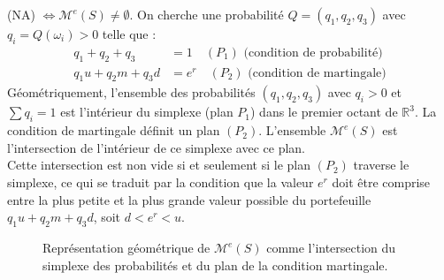 \documentclass[12pt,a4paper]{article}
\makeatletter
\numberwithin{equation}{section}
\theoremstyle{plain} %
\theoremstyle{definition} %
\theoremstyle{remark} %
\theoremstyle{myexample}
\theoremstyle{definition}
\renewenvironment{proof}[1][\proofname]{%
  \par\vspace{0.8em}%
  \pushQED{\qed}%
  \normalfont\color{cyan}%
  \topsep6\p@\@plus6\p@\relax
  \trivlist
  \item[\hskip\labelsep\bfseries\color{cyan}#1\@addpunct{.}]\ignorespaces
}{%
  \popQED\endtrivlist\vspace{0.8em}%
}
\makeatother
\begin{document}
\begin{proof}
(NA) $\iff \mathcal{M}^e(S) \neq \emptyset$. On cherche une probabilité $Q=(q_1, q_2, q_3)$ avec $q_i = Q(\omega_i) > 0$ telle que :
\begin{align*}
    q_1 + q_2 + q_3 &= 1 \quad (P_1) \text{ (condition de probabilité)} \\
    q_1 u + q_2 m + q_3 d &= e^r \quad (P_2) \text{ (condition de martingale)}
\end{align*}
Géométriquement, l'ensemble des probabilités $(q_1, q_2, q_3)$ avec $q_i>0$ et $\sum q_i=1$ est l'intérieur du simplexe (plan $P_1$) dans le premier octant de $\mathbb{R}^3$. La condition de martingale définit un plan $(P_2)$. L'ensemble $\mathcal{M}^e(S)$ est l'intersection de l'intérieur de ce simplexe avec ce plan. \\
Cette intersection est non vide si et seulement si le plan $(P_2)$ traverse le simplexe, ce qui se traduit par la condition que la valeur $e^r$ doit être comprise entre la plus petite et la plus grande valeur possible du portefeuille $q_1 u + q_2 m + q_3 d$, soit $d < e^r < u$.
\end{proof}

\begin{figure}[h!]
\centering
{}
\caption{Représentation géométrique de $\mathcal{M}^e(S)$ comme l'intersection du simplexe des probabilités et du plan de la condition martingale.}
\end{figure}
\end{document}
